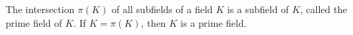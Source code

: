 The intersection $\pi(K)$ of all subfields of a field $K$ is a subfield of $K$, called the prime field of $K$. If $K = \pi(K)$, then $K$ is a prime field.
